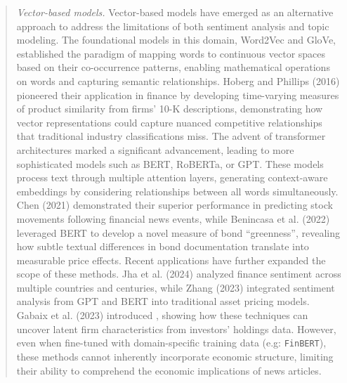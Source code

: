 \begin{quote}
\hspace{0.5cm} \textit{Vector-based models.} 
Vector-based models have emerged as an alternative approach to address the limitations of both sentiment analysis and topic modeling. The foundational models in this domain, Word2Vec and GloVe, established the paradigm of mapping words to continuous vector spaces based on their co-occurrence patterns, enabling mathematical operations on words and capturing semantic relationships.
\cite{hoberg2016text}  Hoberg and Phillips (2016) 
pioneered their application in finance by developing time-varying measures of product similarity from firms' 10-K descriptions, demonstrating how vector representations could capture nuanced competitive relationships that traditional industry classifications miss.
%
The advent of transformer architectures marked a significant advancement, leading to more sophisticated models such as BERT, RoBERTa, or GPT. These models process text through multiple attention layers, generating context-aware embeddings by considering relationships between all words simultaneously. 
\cite{chen2021stock}  Chen (2021) 
demonstrated their superior performance in predicting stock movements following financial news events, while 
\cite{benincasa2022different}  Benincasa et al. (2022) 
leveraged BERT to develop a novel measure of bond ``greenness'', revealing how subtle textual differences in bond documentation translate into measurable price effects.
%
Recent applications have further expanded the scope of these methods. 
\cite{jha2022does}  Jha et al. (2024) 
analyzed finance sentiment across multiple countries and centuries, while 
\cite{zhang2023feel}  Zhang (2023) 
integrated sentiment analysis from GPT and BERT into traditional asset pricing models. 
\cite{gabaix2023asset}  Gabaix et al. (2023) 
introduced , showing how these techniques can uncover latent firm characteristics from investors' holdings data. However, even when fine-tuned with domain-specific training data (e.g: \texttt{FinBERT}), these methods cannot inherently incorporate economic structure, limiting their ability to comprehend the economic implications of news articles.
\end{quote}

